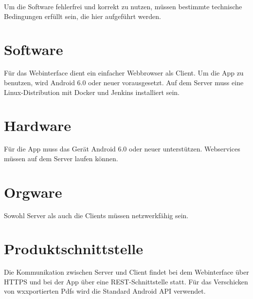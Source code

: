 Um die Software fehlerfrei und korrekt zu nutzen, müssen bestimmte technische Bedingungen erfüllt sein, die hier aufgeführt werden.

\section{Software}

Für das Webinterface dient ein einfacher Webbrowser als Client.
Um die App zu benutzen, wird Android 6.0 oder neuer vorausgesetzt.
\newline
\newline
Auf dem Server muss eine Linux-Distribution mit Docker und Jenkins installiert sein.

\section{Hardware}

Für die App muss das Gerät Android 6.0 oder neuer unterstützen.
\newline
\newline
Webservices müssen auf dem Server laufen können.


\section{Orgware}

Sowohl Server als auch die Clients müssen netzwerkfähig sein.


\section{Produktschnittstelle}

Die Kommunikation zwischen Server und Client findet bei dem Webinterface über HTTPS und bei der App über eine REST-Schnittstelle statt. Für das Verschicken von wxxportierten Pdfs wird die Standard Android API verwendet.